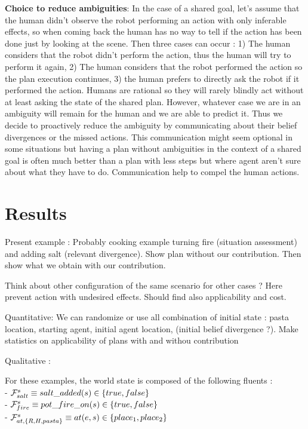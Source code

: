 \documentclass[letterpaper]{article} %
\begin{document}
\textbf{Choice to reduce ambiguities}:
In the case of a shared goal, let's assume that the human didn't observe the robot performing an action with only inferable effects, so when coming back the human has no way to tell if the action has been done just by looking at the scene. Then three cases can occur : 1) The human considers that the robot didn't perform the action, thus the human will try to perform it again, 2) The human considers that the robot performed the action so the plan execution continues, 3) the human prefers to directly ask the robot if it performed the action. 
Humans are rational so they will rarely blindly act without at least asking the state of the shared plan. However, whatever case we are in an ambiguity will remain for the human and we are able to predict it. Thus we decide to proactively reduce the ambiguity by communicating about their belief divergences or the missed actions. This communication might seem optional in some situations but having a plan without ambiguities in the context of a shared goal is often much better than a plan with less steps but where agent aren't sure about what they have to do. Communication help to compel the human actions.

\section{Results}

Present example : Probably cooking example turning fire (situation assessment) and adding salt (relevant divergence). Show plan without our contribution. Then show what we obtain with our contribution.



Think about other configuration of the same scenario for other cases ? Here prevent action with undesired effects. Should find also applicability and cost.

Quantitative: We can randomize or use all combination of initial state : pasta location, starting agent, initial agent location, (initial belief divergence ?). Make statistics on applicability of plans with and withou contribution 

Qualitative :

For these examples, the world state is composed of the following fluents :\\
- $\mathcal{F}^{s}_{salt} \equiv salt\_added(s)\in\{true, false\}$\\
- $\mathcal{F}^{s}_{fire} \equiv pot\_fire\_on(s)\in\{true, false\}$\\
- $\mathcal{F}^{s}_{at, \{R,H,pasta\} } \equiv at(e, s)\in \{place_1, place_2\}$
\end{document}
